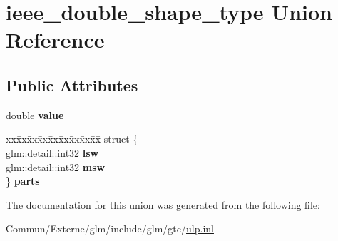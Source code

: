 \hypertarget{unionieee__double__shape__type}{}\section{ieee\+\_\+double\+\_\+shape\+\_\+type Union Reference}
\label{unionieee__double__shape__type}
\subsection*{Public Attributes}
\begin{DoxyCompactItemize}
\item 
double {\bfseries value}\hypertarget{unionieee__double__shape__type_a2d9c4cab9e3fa74e4be6d72f798a145b}{}\label{unionieee__double__shape__type_a2d9c4cab9e3fa74e4be6d72f798a145b}

\item 
\begin{tabbing}
xx\=xx\=xx\=xx\=xx\=xx\=xx\=xx\=xx\=\kill
struct \{\\
\>glm::detail::int32 {\bfseries lsw}\\
\>glm::detail::int32 {\bfseries msw}\\
\} {\bfseries parts}\hypertarget{unionieee__double__shape__type_a5b93add2b09b4a829f81fd66656e9601}{}\label{unionieee__double__shape__type_a5b93add2b09b4a829f81fd66656e9601}
\\

\end{tabbing}\end{DoxyCompactItemize}


The documentation for this union was generated from the following file\+:\begin{DoxyCompactItemize}
\item 
Commun/\+Externe/glm/include/glm/gtc/\hyperlink{ulp_8inl}{ulp.\+inl}\end{DoxyCompactItemize}
